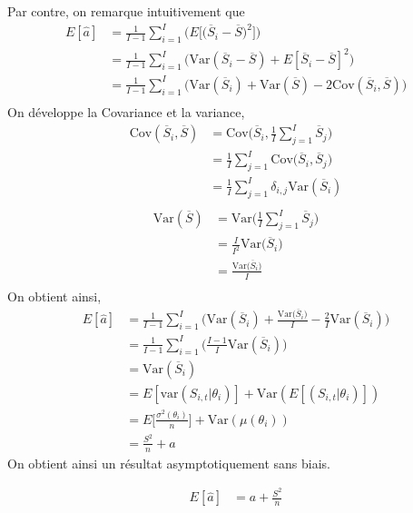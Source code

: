 \documentclass[11pt,french]{report}
\begin{document}
Par contre, on remarque intuitivement que
\begin{align*}
E[\widehat{a}] &= \frac{1}{I - 1}\sum_{i=1}^{I}\Bigg( E\Big[  \big( \overline{S}_i - \overline{S} \big)^2 \Big]\Bigg) \\
&= \frac{1}{I - 1}\sum_{i=1}^{I}\Bigg( \text{Var}(\overline{S}_i - \overline{S}) + E[\overline{S}_i - \overline{S}]^2 \Bigg) \\
&= \frac{1}{I - 1}\sum_{i=1}^{I}\Bigg( \text{Var}(\overline{S}_i) + \text{Var}(\overline{S}) -2 \text{Cov}(\overline{S}_i, \overline{S}) \Bigg) \\
\end{align*}
On développe la Covariance et la variance,
\begin{align*}
\text{Cov}(\overline{S}_i, \overline{S}) &= \text{Cov}\Big(\overline{S}_i, \frac{1}{I}\sum_{j=1}^{I} \overline{S}_j\Big) \\
&= \frac{1}{I} \sum_{j=1}^{I} \text{Cov}\Big(\overline{S}_i,\overline{S}_j\Big) \\
&= \frac{1}{I} \sum_{j=1}^{I} \delta_{i,j} \text{Var}(\overline{S}_i) \\
\end{align*}
\begin{align*}
\text{Var}(\overline{S}) &= \text{Var}\Big(\frac{1}{I}\sum_{j=1}^{I} \overline{S}_j\Big) \\
&= \frac{I}{I^2} \text{Var}\Big(\overline{S}_i\Big) \\
&= \frac{\text{Var}\Big(\overline{S}_i\Big)}{I}  \\
\end{align*}
On obtient ainsi,
\begin{align*}
E[\widehat{a}] &= \frac{1}{I - 1}\sum_{i=1}^{I}\Bigg( \text{Var}(\overline{S}_i) + \frac{\text{Var}\Big(\overline{S}_i\Big)}{I} - \frac{2}{I} \text{Var}(\overline{S}_i) \Bigg) \\
&=  \frac{1}{I - 1}\sum_{i=1}^{I}\Bigg(\frac{I - 1}{I} \text{Var}(\overline{S}_i)\Bigg) \\
&= \text{Var}(\overline{S}_i) \\
&= E[\text{var}(S_{i,t}|\theta_i)] + \text{Var}(E[(S_{i,t}|\theta_i)]) \\
&= E\Big[ \frac{\sigma^2(\theta_i)}{n}\Big] + \text{Var}(\mu(\theta_i)) \\
&= \frac{S^2}{n} + a
\end{align*}
On obtient ainsi un résultat asymptotiquement sans biais.

\begin{align*}
E[\widehat{a}] &= a + \frac{S^2}{n}
\end{align*}
\end{document}

